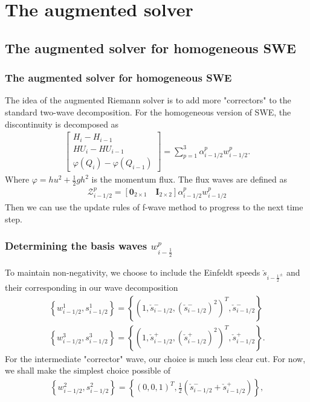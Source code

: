 \documentclass{beamer}
\begin{document}
\section{The augmented solver}
\subsection{The augmented solver for homogeneous SWE}
\frame
{
\frametitle{The augmented solver for homogeneous SWE}
The idea of the augmented Riemann solver is to add more "correctors" to the standard two-wave decomposition. For the homogeneous version of SWE, the discontinuity is decomposed as
\begin{align*}
\begin{bmatrix}
H_i-H_{i-1}\\
HU_i-HU_{i-1}\\
\varphi(Q_i)-\varphi(Q_{i-1})
\end{bmatrix}=\sum_{p=1}^3 \alpha_{i-1/2}^p w_{i-1/2}^p.
\end{align*}
Where $\varphi=h u^2+\frac{1}{2} g h^2$ is the momentum flux. The flux waves are defined as
\begin{align*}
\mathcal{Z}_{i-1/2}^p =\left[\mathbf{0}_{2\times1} \quad \mathbf{I}_{2\times2}\right] \alpha_{i-1/2}^p w_{i-1/2}^p
\end{align*}
Then we can use the update rules of f-wave method to progress to the next time step. 
}

\frame
{
\frametitle{Determining the basis waves $w_{i-\frac{1}{2}}^p$}
To maintain non-negativity, we choose to include the Einfeldt speeds $\check s_{i-\frac{1}{2}^\pm}$ and their corresponding  in our wave decomposition
\begin{align*}
\left\{ w_{i-1/2}^1,s_{i-1/2}^1\right\}=\left\{\left(1,\check{s}_{i-1/2}^-,\left(\check{s}_{i-1/2}^-\right)^2\right)^T, \check{s}_{i-1/2}^- \right\} \\
\left\{ w_{i-1/2}^3,s_{i-1/2}^3\right\}=\left\{\left(1,\check{s}_{i-1/2}^+,\left(\check{s}_{i-1/2}^+\right)^2\right)^T, \check{s}_{i-1/2}^+ \right\}.
\end{align*}
For the intermediate "corrector" wave, our choice is much less clear cut.  For now, we shall make the simplest choice possible of
\begin{align*}
\left\{ w_{i-1/2}^2,s_{i-1/2}^2      \right\}=\left\{  \left(0,0,1\right)^T, \frac{1}{2} \left(\check{s}_{i-1/2}^- + \check{s}_{i-1/2}^+ \right)    \right\},
\end{align*}
}
\end{document}
